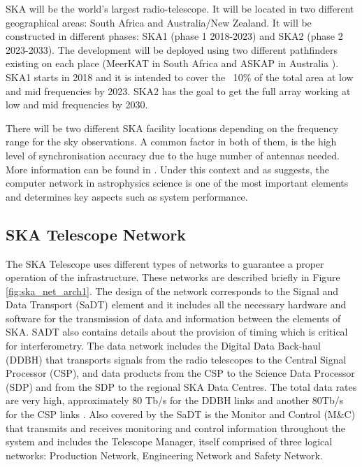 SKA will be the world's largest radio-telescope. It will be located in two different geographical areas: South Africa and Australia/New Zealand. It will be
constructed in different phases: SKA1 (phase 1 2018-2023) and SKA2 (phase 2
2023-2033). The development will be deployed using two different pathfinders
existing on each place (MeerKAT in South Africa \cite{ska:meerkat} and ASKAP in Australia \cite{ska:askap}).  
SKA1 starts in 2018 and it is intended to cover the ~10\% of
the total area at low and mid frequencies by 2023. SKA2 has
the goal to get the full array working at low and mid frequencies by 2030.

There will be two different SKA facility locations depending on the frequency
range for the sky observations. A common factor in both of them, is the high level of synchronisation accuracy due to the huge number of antennas needed.
More information can be found in  \cite{ska:baseline_description_v2}. Under
this context and as \cite{HUANG201727} suggests, the computer network in
astrophysics science is one of the most important elements and determines key
aspects such as system performance.

\subsection{SKA Telescope Network} \label{subsec:ska-telescope}

The SKA Telescope uses different types of networks to guarantee a proper
operation of the infrastructure. These networks are described briefly in
Figure \ref{fig:ska_net_arch1}. The design of the network corresponds to the
Signal and Data Transport (SaDT) element \cite{ska:sadt_website} and it
includes all the necessary hardware and software for the transmission of data and
information between the elements of SKA. SADT also contains details about
the provision of timing which is critical for interferometry.  The data network
includes the Digital Data Back-haul (DDBH) that transports signals from the
radio telescopes to the Central Signal Processor (CSP), and data products from
the CSP to the Science Data Processor (SDP) and from the SDP to the regional
SKA Data Centres. The total data rates are very high, approximately 80 Tb/s for
the DDBH links and another 80Tb/s for the CSP links \cite{ska:consortia-news}.
Also covered by the SaDT is the Monitor and Control (M\&C) that transmits and
receives monitoring and control information throughout the system and includes
the Telescope Manager, itself comprised of three logical networks: Production
Network, Engineering Network and Safety Network.

